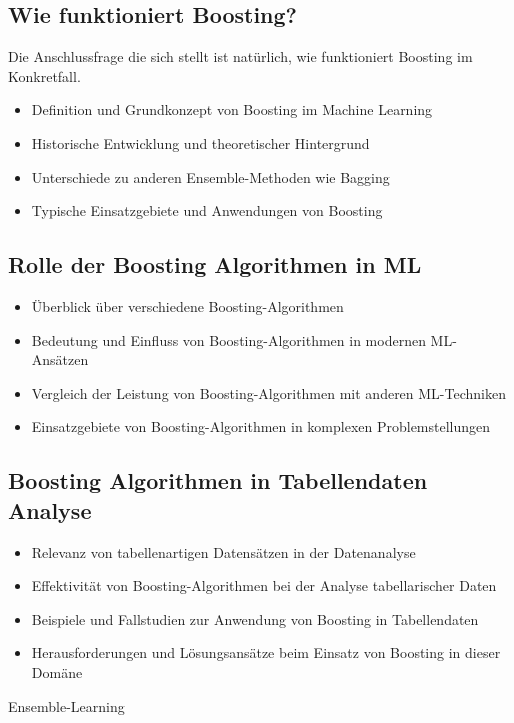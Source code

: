 \subsection{Wie funktioniert Boosting?}
Die Anschlussfrage die sich stellt ist natürlich, wie funktioniert Boosting im Konkretfall.\cite{SWB-672276232}


\begin{itemize}
    \item Definition und Grundkonzept von Boosting im Machine Learning
    \item Historische Entwicklung und theoretischer Hintergrund
    \item Unterschiede zu anderen Ensemble-Methoden wie Bagging
    \item Typische Einsatzgebiete und Anwendungen von Boosting
\end{itemize}

\subsection{Rolle der Boosting Algorithmen in ML}
\begin{itemize}
    \item Überblick über verschiedene Boosting-Algorithmen
    \item Bedeutung und Einfluss von Boosting-Algorithmen in modernen ML-Ansätzen
    \item Vergleich der Leistung von Boosting-Algorithmen mit anderen ML-Techniken
    \item Einsatzgebiete von Boosting-Algorithmen in komplexen Problemstellungen
\end{itemize}

\subsection{Boosting Algorithmen in Tabellendaten Analyse}
\begin{itemize}
    \item Relevanz von tabellenartigen Datensätzen in der Datenanalyse
    \item Effektivität von Boosting-Algorithmen bei der Analyse tabellarischer Daten
    \item Beispiele und Fallstudien zur Anwendung von Boosting in Tabellendaten
    \item Herausforderungen und Lösungsansätze beim Einsatz von Boosting in dieser Domäne
\end{itemize}

Ensemble-Learning\cite{ibmBoosting}